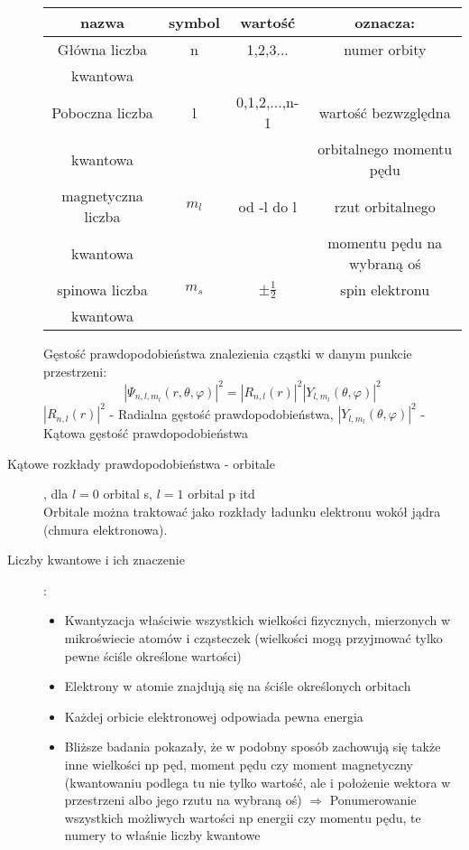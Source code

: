 \documentclass[a4paper,11pt]{article}
\begin{document}
\begin{description}
  \begin{tabular}{|c|c|c|c|}
    \hline
    \textbf{nazwa} & \textbf{symbol} & \textbf{wartość} & oznacza:\\
    \hline
    \hline
    Główna liczba & n & 1,2,3... & numer orbity\\
    kwantowa & & &\\
    \hline
    Poboczna liczba & l & 0,1,2,...,n-1 & wartość bezwzględna\\
    kwantowa& & &orbitalnego momentu pędu\\
    \hline
    magnetyczna liczba & $m_l$ & od -l do l & rzut orbitalnego\\
    kwantowa & & & momentu pędu na wybraną oś\\
    \hline
    spinowa liczba & $m_s$ & $\pm\frac{1}{2}$ & spin elektronu\\
    kwantowa & & & \\
    \hline
  \end{tabular}
  Gęstość prawdopodobieństwa znalezienia cząstki w danym punkcie przestrzeni:
  $$|\Psi_{n,l,m_l}\left(r,\theta,\varphi\right)|^2=|R_{n,l}(r)|^2|Y_{l,m_l}\left(\theta, \varphi\right)|^2$$
  $|R_{n,l}(r)|^2$ - Radialna gęstość prawdopodobieństwa, $|Y_{l,m_l}\left(\theta, \varphi\right)|^2$ - Kątowa gęstość prawdopodobieństwa
\item[Kątowe rozkłady prawdopodobieństwa - orbitale], dla $l=0$ orbital s, $l=1$ orbital p itd\\
  Orbitale można traktować jako rozkłady ładunku elektronu wokół jądra (chmura elektronowa).
\item[Liczby kwantowe i ich znaczenie] :
  \begin{itemize}
  \item Kwantyzacja właściwie wszystkich wielkości fizycznych, mierzonych w mikroświecie atomów i cząsteczek (wielkości mogą przyjmować tylko pewne ściśle określone wartości)
  \item Elektrony w atomie znajdują się na ściśle określonych orbitach
  \item Każdej orbicie elektronowej odpowiada pewna energia
  \item Bliższe badania pokazały, że w podobny sposób zachowują się także inne wielkości np pęd, moment pędu czy moment magnetyczny (kwantowaniu podlega tu nie tylko wartość, ale i położenie wektora w przestrzeni albo jego rzutu na wybraną oś) $\Rightarrow$ Ponumerowanie wszystkich możliwych wartości np energii czy momentu pędu, te numery to właśnie liczby kwantowe
  \end{itemize}
\end{description}
\end{document}
